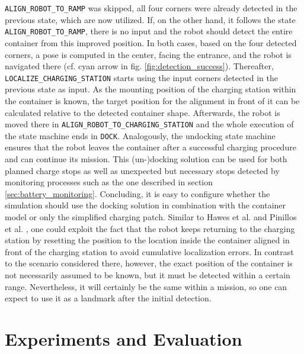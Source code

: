 \documentclass[english, master, utf8]{base/thesis_KBS}
\newcommand{\code}[1]{\colorbox{light-gray}{\texttt{#1}}}
\begin{document}
\code{ALIGN\_ROBOT\_TO\_RAMP} was skipped, all four corners were already detected in the previous state, which are now utilized. If, on the other hand, it follows the state
\code{ALIGN\_ROBOT\_TO\_RAMP}, there is no input and the robot should detect the entire container from this improved position. In both cases, based on the four detected corners,
a pose is computed in the center, facing the entrance, and the robot is navigated there (cf. cyan arrow in fig. \ref{fig:detection_success}). Thereafter, \code{LOCALIZE\_CHARGING\_STATION} starts using the input corners detected in the
previous state as input. As the mounting position of the charging station within the container is known, the target position for the alignment in front of it can be calculated
relative to the detected container shape. Afterwards, the robot is moved there in \code{ALIGN\_ROBOT\_TO\_CHARGING\_STATION} and the whole execution of the state machine ends in
\code{DOCK}. Analogously, the undocking state machine ensures that the robot leaves the container after a successful charging procedure and can continue its mission.\newline
This (un-)docking solution can be used for both planned charge stops as well as unexpected but necessary stops detected by monitoring processes such as the one described in section
\ref{sec:battery_monitoring}. Concluding, it is easy to configure whether the simulation should use the docking solution in combination with the container model or only the simplified
charging patch. Similar to Hawes et al. \cite{Hawes:2017} and Pinillos et al. \cite{Pinillos:2016}, one could exploit the fact that the
robot keeps returning to the charging station by resetting the position to the location inside the container aligned in front of the charging station to avoid cumulative localization
errors. In contrast to the scenario considered there, however, the exact position of the container is not necessarily assumed to be known, but it must be detected within a certain
range. Nevertheless, it will certainly be the same within a mission, so one can expect to use it as a landmark after the initial detection.\newline

\chapter{Experiments and Evaluation}
\end{document}
